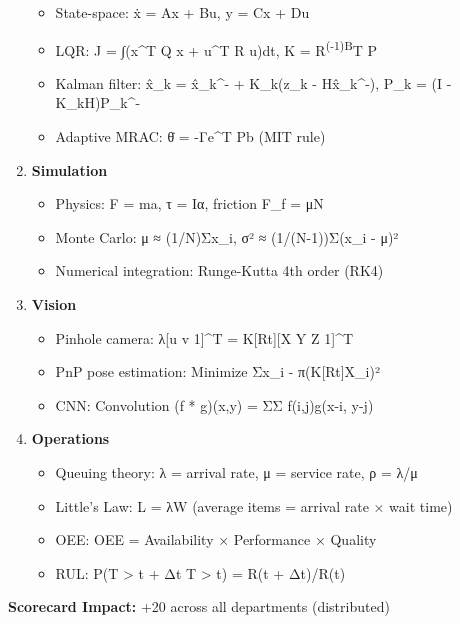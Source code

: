\documentclass[
]{article}
\providecommand{\tightlist}{%
  \setlength{\itemsep}{0pt}\setlength{\parskip}{0pt}}
\begin{document}
\begin{enumerate}
  \begin{itemize}
  \tightlist
  \item
    State-space: ẋ = Ax + Bu, y = Cx + Du
  \item
    LQR: J = ∫(x\^{}T Q x + u\^{}T R u)dt, K = R\textsuperscript{(-1)B}T
    P
  \item
    Kalman filter: x̂\_k = x̂\_k\^{}- + K\_k(z\_k - Hx̂\_k\^{}-), P\_k = (I
    - K\_kH)P\_k\^{}-
  \item
    Adaptive MRAC: θ̇ = -Γe\^{}T Pb (MIT rule)
  \end{itemize}
\item
  \textbf{Simulation}

  \begin{itemize}
  \tightlist
  \item
    Physics: F = ma, τ = Iα, friction F\_f = μN
  \item
    Monte Carlo: μ ≈ (1/N)Σx\_i, σ² ≈ (1/(N-1))Σ(x\_i - μ)²
  \item
    Numerical integration: Runge-Kutta 4th order (RK4)
  \end{itemize}
\item
  \textbf{Vision}

  \begin{itemize}
  \tightlist
  \item
    Pinhole camera: λ{[}u v 1{]}\^{}T = K{[}R\textbar t{]}{[}X Y Z
    1{]}\^{}T
  \item
    PnP pose estimation: Minimize Σ\textbar\textbar x\_i -
    π(K{[}R\textbar t{]}X\_i)\textbar\textbar²
  \item
    CNN: Convolution (f * g)(x,y) = ΣΣ f(i,j)g(x-i, y-j)
  \end{itemize}
\item
  \textbf{Operations}

  \begin{itemize}
  \tightlist
  \item
    Queuing theory: λ = arrival rate, μ = service rate, ρ = λ/μ
  \item
    Little's Law: L = λW (average items = arrival rate × wait time)
  \item
    OEE: OEE = Availability × Performance × Quality
  \item
    RUL: P(T \textgreater{} t + Δt \textbar{} T \textgreater{} t) = R(t
    + Δt)/R(t)
  \end{itemize}
\end{enumerate}

\textbf{Scorecard Impact:} +20 across all departments (distributed)
\end{document}

